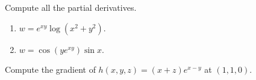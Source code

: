 \documentclass[openany]{book}
\begin{document}
\begin{prob}
    Compute all the partial derivatives.
    \begin{enumerate}
        \item $w=e^{xy}\log(x^2+y^2)$.
        \item $w=\cos(ye^{xy})\sin x$.
    \end{enumerate}
\end{prob}


\begin{prob}
    Compute the gradient of $h(x,y,z)=(x+z)e^{x-y}$ at $(1,1,0)$.
\end{prob}
\end{document}
